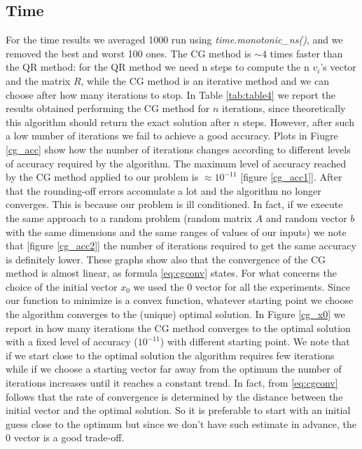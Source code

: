 \documentclass{article}
\begin{document}
\subsection{Time}\label{subsec:time}
For the time results we averaged 1000 run using \textit{time.monotonic\_ns()}, and we removed the best and worst 100 ones.
The CG method is $\sim 4$ times faster than the QR method: for the QR method we need n steps to compute the n $v_{i}$'s vector and the matrix $R$, while the CG method is an iterative method and we can choose after how many iterations to stop. In Table \ref{tab:table4} we report the results obtained performing the CG method for $n$ iterations, since theoretically this algorithm should return the exact solution after $n$ steps. However, after such a low number of iterations we fail to achieve a good accuracy. Plots in Fiugre \ref{cg_acc} show how the number of iterations changes according to different levels of accuracy required by the algorithm. The maximum level of accuracy reached by the CG method applied to our problem is $\approx 10^{-11}$ [figure \ref{cg_acc1}]. After that the rounding-off errors accomulate a lot and the algorithm no longer converges. This is because our problem is ill conditioned. In fact, if we execute the same approach to a random problem (random matrix $A$ and random vector $b$ with the same dimensions and the same ranges of values of our inputs) we note that [figure \ref{cg_acc2}] the number of iterations required to get the same accuracy is definitely lower. These graphs show also that the convergence of the CG method is almost linear, as formula \eqref{eq:cgconv} states. For what concerns the choice of the initial vector $x_0$ we used the 0 vector for all the experiments. Since our function to minimize is a convex function, whatever starting point we choose the algorithm converges to the (unique) optimal solution. In Figure \ref{cg_x0} we report in how many iterations the CG method converges to the optimal solution with a fixed level of accuracy ($10^{-11}$) with different starting point. We note that if we start close to the optimal solution the algorithm requires few iterations while if we choose a starting vector far away from the optimum the number of iterations increases until it reaches a constant trend. In fact, from \eqref{eq:cgconv} follows that the rate of convergence is determined by the distance between the initial vector and the optimal solution. So it is preferable to start with an initial guess close to the optimum but since we don't have such estimate in advance, the 0 vector is a good trade-off.   
\end{document}

